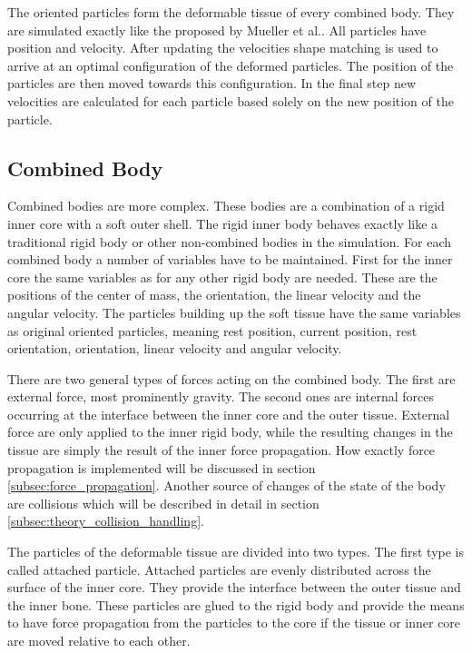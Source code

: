 The oriented particles form the deformable tissue of every combined body. They are simulated exactly like the proposed by Mueller et al.. All particles have position and velocity. After updating the velocities shape matching is used to arrive at an optimal configuration of the deformed particles. The position of the particles are then moved towards this configuration. In the final step new velocities are calculated for each particle based solely on the new position of the particle.

\subsection{Combined Body}
\label{subsec:combined_body}
Combined bodies are more complex. These bodies are a combination of a rigid inner core with a soft outer shell. The rigid inner body behaves exactly like a traditional rigid body or other non-combined bodies in the simulation. For each combined body a number of variables have to be maintained. First for the inner core the same variables as for any other rigid body are needed. These are the positions of the center of mass, the orientation, the linear velocity and the angular velocity. The particles building up the soft tissue have the same variables as original oriented particles, meaning rest position, current position, rest orientation, orientation, linear velocity and angular velocity.

There are two general types of forces acting on the combined body. The first are external force, most prominently gravity. The second ones are internal forces occurring at the interface between the inner core and the outer tissue. External force are only applied to the inner rigid body, while the resulting changes in the tissue are simply the result of the inner force propagation. How exactly force propagation is implemented will be discussed in section \ref{subsec:force_propagation}. Another source of changes of the state of the body are collisions which will be described in detail in section \ref{subsec:theory_collision_handling}.

The particles of the deformable tissue are divided into two types. The first type is called attached particle. Attached particles are evenly distributed across the surface of the inner core. They provide the interface between the outer tissue and the inner bone. These particles are glued to the rigid body and provide the means to have force propagation from the particles to the core if the tissue or inner core are moved relative to each other.

